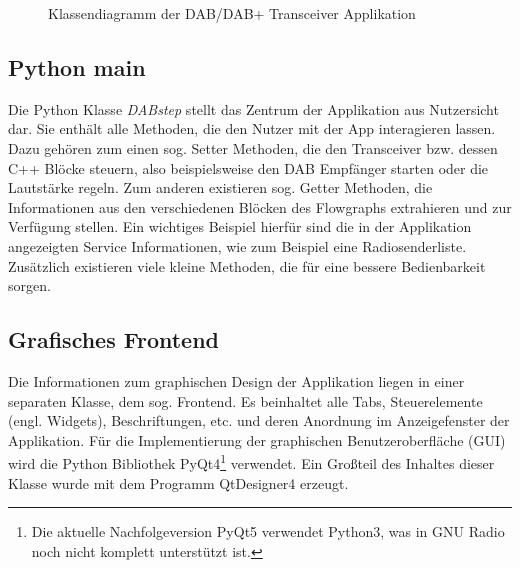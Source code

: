 \begin{figure}[b!]
\begin{center}
\end{center}
\caption{Klassendiagramm der DAB/DAB+ Transceiver Applikation}
\label{fig:class_diagramm}
\end{figure}

\subsection{Python main}
Die Python Klasse \glqq \textit{DABstep}\grqq{} stellt das Zentrum der Applikation aus Nutzersicht dar. Sie enthält alle Methoden, die den Nutzer mit der App interagieren lassen. Dazu gehören zum einen sog. Setter Methoden, die den Transceiver bzw. dessen C++ Blöcke steuern, also beispielsweise den DAB Empfänger starten oder die Lautstärke regeln. Zum anderen existieren sog. Getter Methoden, die Informationen aus den verschiedenen Blöcken des Flowgraphs extrahieren und zur Verfügung stellen. Ein wichtiges Beispiel hierfür sind die in der Applikation angezeigten Service Informationen, wie zum Beispiel eine Radiosenderliste. Zusätzlich existieren viele kleine Methoden, die für eine bessere Bedienbarkeit sorgen.

\subsection{Grafisches Frontend}
Die Informationen zum graphischen Design der Applikation liegen in einer separaten Klasse, dem sog. Frontend. Es beinhaltet alle Tabs, Steuerelemente (engl. Widgets), Beschriftungen, etc. und deren Anordnung im Anzeigefenster der Applikation. Für die Implementierung der graphischen Benutzeroberfläche (GUI) wird die Python Bibliothek PyQt4\footnote{Die aktuelle Nachfolgeversion PyQt5 verwendet Python3, was in GNU Radio noch nicht komplett unterstützt ist.} verwendet. Ein Großteil des Inhaltes dieser Klasse wurde mit dem Programm QtDesigner4 erzeugt.

